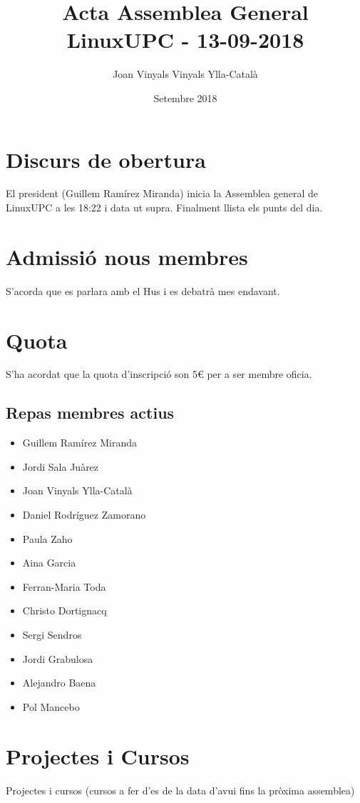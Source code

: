 \documentclass{article}
\title{Acta Assemblea General LinuxUPC - 13-09-2018}
\author{Joan Vinyals Vinyals Ylla-Català}
\date{Setembre 2018}
\begin{document}
\maketitle

\section{Discurs de obertura}

El president (Guillem Ramírez Miranda) inicia la Assemblea general de LinuxUPC a les 18:22 i data ut supra. Finalment llista els punts del dia.


\section{Admissió nous membres}
S'acorda que es parlara amb el Hus i es debatrà mes endavant.

\section{Quota}
S'ha acordat que la quota d'inscripció son 5\euro{} per a ser membre oficia.

\subsection{Repas membres actius}
\begin{itemize}
  \item Guillem Ramírez Miranda
  \item Jordi Sala Juàrez
  \item Joan Vinyals Ylla-Català
  \item Daniel Rodríguez Zamorano
  \item Paula Zaho
  \item Aina Garcia
  \item Ferran-Maria Toda
  \item Christo Dortignacq
  \item Sergi Sendros
  \item Jordi Grabulosa
  \item Alejandro Baena
  \item Pol Mancebo
\end{itemize}

\section{Projectes i Cursos}
Projectes i cursos (cursos a fer d'es de la data d'avui fins la pròxima assemblea)
\end{document}
